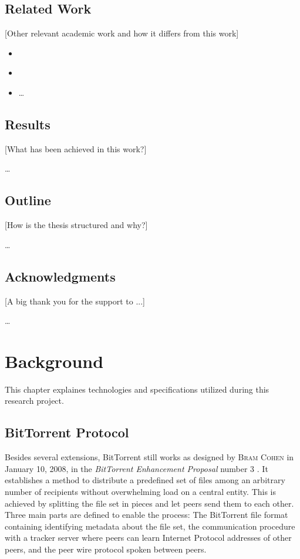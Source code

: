 \documentclass[10pt, a4paper]{scrartcl} %
\renewcommand{\_}{\origunderscore\allowbreak}
\begin{document}
\subsection{Related Work}
[Other relevant academic work and how it differs from this work]

\begin{itemize}
  \item \cite{watters2011much}
  \item \cite{drachen2011distribution}
  \item \dots
\end{itemize}

\subsection{Results}
[What has been achieved in this work?]

\dots

\subsection{Outline}
[How is the thesis structured and why?]

\dots

\subsection{Acknowledgments}
[A big thank you for the support to ...]

\dots

\section{Background}
This chapter explaines technologies and specifications utilized during this research project.

\subsection{BitTorrent Protocol}
Besides several extensions, BitTorrent still works as designed by \textsc{Bram Cohen} in January 10, 2008, in the \emph{BitTorrent Enhancement Proposal} number 3 \cite{bep3}. It establishes a method to distribute a predefined set of files among an arbitrary number of recipients without overwhelming load on a central entity. This is achieved by splitting the file set in pieces and let peers send them to each other. Three main parts are defined to enable the process: The BitTorrent file format containing identifying metadata about the file set, the communication procedure with a tracker server where peers can learn Internet Protocol addresses of other peers, and the peer wire protocol spoken between peers.
\end{document}
